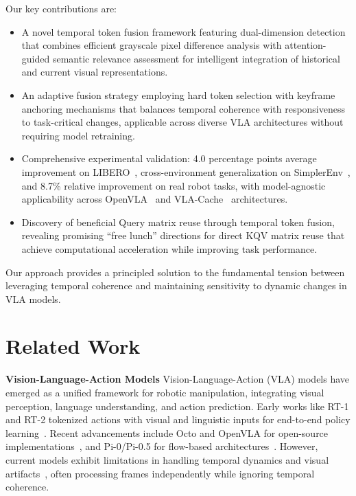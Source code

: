 \documentclass[letterpaper]{article}
\begin{document}
Our key contributions are:
\begin{itemize}
\item A novel temporal token fusion framework featuring dual-dimension detection that combines efficient grayscale pixel difference analysis with attention-guided semantic relevance assessment for intelligent integration of historical and current visual representations.
\item An adaptive fusion strategy employing hard token selection with keyframe anchoring mechanisms that balances temporal coherence with responsiveness to task-critical changes, applicable across diverse VLA architectures without requiring model retraining.
\item Comprehensive experimental validation: 4.0 percentage points average improvement on LIBERO~\cite{liu2023libero}, cross-environment generalization on SimplerEnv~\cite{li24simpler}, and 8.7\% relative improvement on real robot tasks, with model-agnostic applicability across OpenVLA~\cite{kim2024openvla} and VLA-Cache~\cite{xu2025vla} architectures.
\item Discovery of beneficial Query matrix reuse through temporal token fusion, revealing promising ``free lunch'' directions for direct KQV matrix reuse that achieve computational acceleration while improving task performance.
\end{itemize}

Our approach provides a principled solution to the fundamental tension between leveraging temporal coherence and maintaining sensitivity to dynamic changes in VLA models.


\section{Related Work}

\noindent\textbf{Vision-Language-Action Models} Vision-Language-Action (VLA) models have emerged as a unified framework for robotic manipulation, integrating visual perception, language understanding, and action prediction. Early works like RT-1 and RT-2 tokenized actions with visual and linguistic inputs for end-to-end policy learning~\cite{brohan2022rt1,brohan2023rt2}. Recent advancements include Octo and OpenVLA for open-source implementations~\cite{pertsch2024octo,kim2024openvla,kim2025oft}, and Pi-0/Pi-0.5 for flow-based architectures~\cite{black2024pi0,black2025pi05}. However, current models exhibit limitations in handling temporal dynamics and visual artifacts~\cite{chi2023diffusion,wen2024diffusion,openx2023,huang2024a3vlm}, often processing frames independently while ignoring temporal coherence.
\end{document}
